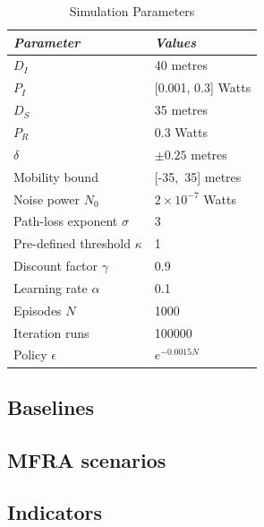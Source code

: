 \documentclass[journal]{IEEEtran}
\begin{document}
\begin{table}
\small
\centering
\caption{Simulation Parameters}
\label{table:simparameters}
\begin{tabular}{ll}
  \hline
 \textit{Parameter} & \textit{Values} \\
  \hline \hline

   $D_{I}$ & 40 metres\\
   $P_{I}$ & [0.001, 0.3] Watts \\
   $D_{S}$ & 35 metres\\
   $P_{R}$ & 0.3 Watts\\
   $\delta$ & $\pm0.25$ metres\\
   Mobility bound & [-35,~35] metres\\
   Noise power $N_0$ & $2 \times 10^{-7}$ Watts\\
   Path-loss exponent $\sigma$ & 3\\
   Pre-defined threshold $\kappa$ & 1\\
   Discount factor $\gamma$ & 0.9\\
   Learning rate $\alpha$ & 0.1\\
   Episodes $N$ & 1000\\
   Iteration runs & 100000\\
   Policy $\epsilon$ & $e^{-0.0015N}$\\

   \hline \hline
 \end{tabular}
 \end{table}


\subsection{Baselines}


\subsection{MFRA scenarios}

\subsection{Indicators}
\end{document}
